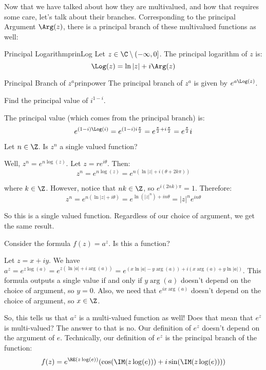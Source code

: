 Now that we have talked about how they are multivalued, and how that requires some care, let's talk about their branches. Corresponding to the principal Argument $\Arg(z)$, there is a principal branch of these multivalued functions as well:

\begin{defbo}{Principal Logarithm}{prinLog}
Let $z\in \C\setminus(-\infty,0]$. The principal logarithm of $z$ is:
$$\Log(z) = \ln|z| + i\Arg(z)$$
\end{defbo}

\begin{defbo}{Principal Branch of $z^a$}{prinpower}
The principal branch of $z^a$ is given by $e^{a\Log(z)}$.
\end{defbo}

\begin{ex}{}{} Find the principal value of $i^{1 - i}$.

The principal value (which comes from the principal branch) is:
$$e^{(1-i)\Log(i)} = e^{(1-i)i\frac{\pi}{2}} = e^{\frac{\pi}{2} + i\frac{\pi}{2}} = e^{\frac{\pi}{2}}i$$
\end{ex}

\begin{ex}{}{} Let $n\in \Z$. Is $z^n$ a single valued function?

Well, $z^n = e^{n\log(z)}$. Let $z = re^{i\theta}$. Then:
$$z^n = e^{n\log(z)} = e^{n(\ln|z| + i(\theta + 2k\pi))}$$

\noin where $k\in \Z$. However, notice that $nk\in \Z$, so $e^{i(2nk)\pi} = 1$. Therefore:
$$z^n = e^{n(\ln|z| + i\theta)} = e^{\ln(|z|^n) + in\theta} = |z|^ne^{in\theta}$$

So this is a single valued function. Regardless of our choice of argument, we get the same result.
\end{ex}

\begin{ex}{}{} Consider the formula $f(z) = a^z$. Is this a function?

Let $z = x +iy$. We have $a^z = e^{z\log(a)} = e^{z(\ln|a| + i\arg(a))} = e^{(x\ln|a| - y\arg(a)) + i(x\arg(a) + y\ln|a|)}$. This formula outputs a single value if and only if $y\arg(a)$ doesn't depend on the choice of argument, so $y = 0$. Also, we need that $e^{ix\arg(a)}$ doesn't depend on the choice of argument, so $x \in \Z$.
\end{ex}

So, this tells us that $a^z$ is a multi-valued function as well! Does that mean that $e^z$ is multi-valued? The answer to that is no. Our definition of $e^z$ doesn't depend on the argument of $e$. Technically, our definition of $e^z$ is the principal branch of the function:
$$f(z) = e^{\RE(z\log(e))}(\cos(\IM(z\log(e))) + i\sin(\IM(z\log(e))))$$

